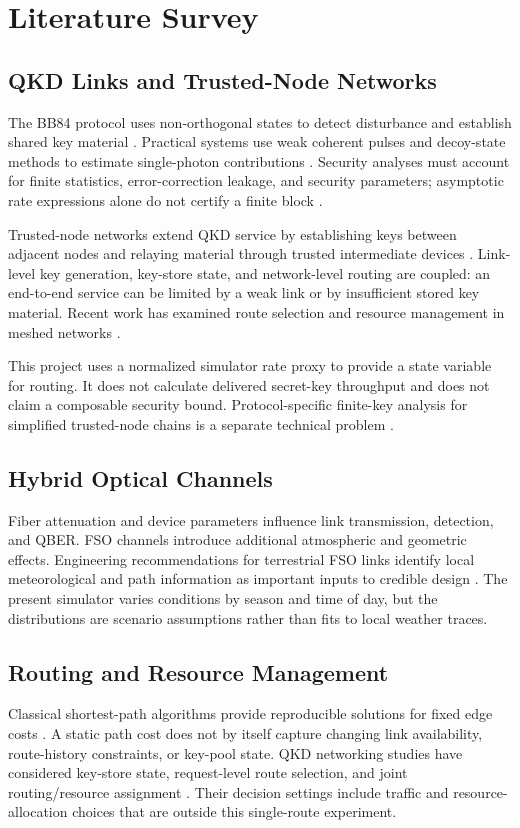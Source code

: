 \documentclass[12pt,a4paper,oneside]{report}
\begin{document}
\chapter{Literature Survey}

\section{QKD Links and Trusted-Node Networks}
The BB84 protocol uses non-orthogonal states to detect disturbance and establish shared key material \cite{bennett1984}. Practical systems use weak coherent pulses and decoy-state methods to estimate single-photon contributions \cite{hwang2003,lo2005}. Security analyses must account for finite statistics, error-correction leakage, and security parameters; asymptotic rate expressions alone do not certify a finite block \cite{gllp2004,tomamichel2012,lim2014}.

Trusted-node networks extend QKD service by establishing keys between adjacent nodes and relaying material through trusted intermediate devices \cite{munro2015,ituY3803}. Link-level key generation, key-store state, and network-level routing are coupled: an end-to-end service can be limited by a weak link or by insufficient stored key material. Recent work has examined route selection and resource management in meshed networks \cite{johann2024}.

This project uses a normalized simulator rate proxy to provide a state variable for routing. It does not calculate delivered secret-key throughput and does not claim a composable security bound. Protocol-specific finite-key analysis for simplified trusted-node chains is a separate technical problem \cite{krawec2024}.

\section{Hybrid Optical Channels}
Fiber attenuation and device parameters influence link transmission, detection, and QBER. FSO channels introduce additional atmospheric and geometric effects. Engineering recommendations for terrestrial FSO links identify local meteorological and path information as important inputs to credible design \cite{ituP1814,krzic2023}. The present simulator varies conditions by season and time of day, but the distributions are scenario assumptions rather than fits to local weather traces.

\section{Routing and Resource Management}
Classical shortest-path algorithms provide reproducible solutions for fixed edge costs \cite{dijkstra1959}. A static path cost does not by itself capture changing link availability, route-history constraints, or key-pool state. QKD networking studies have considered key-store state, request-level route selection, and joint routing/resource assignment \cite{sharma2023,johann2024}. Their decision settings include traffic and resource-allocation choices that are outside this single-route experiment.
\end{document}
